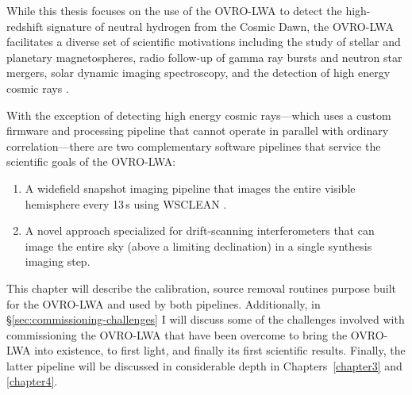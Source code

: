 \begin{bibunit}
While this thesis focuses on the use of the OVRO-LWA to detect the high-redshift signature of
neutral hydrogen from the Cosmic Dawn, the OVRO-LWA facilitates a diverse set of scientific
motivations including the study of stellar and planetary magnetospheres, radio follow-up of gamma
ray bursts \citep{2017arXiv171106665A} and neutron star mergers, solar dynamic imaging spectroscopy,
and the detection of high energy cosmic rays \citep{caltechthesis11016}.

With the exception of detecting high energy cosmic rays---which uses a custom firmware and
processing pipeline that cannot operate in parallel with ordinary correlation---there are two
complementary software pipelines that service the scientific goals of the OVRO-LWA:
\begin{enumerate}
    \item A widefield snapshot imaging pipeline that images the entire visible hemisphere every
        13\,s using WSCLEAN \citep{2014MNRAS.444..606O}.
    \item A novel approach specialized for drift-scanning interferometers that can image the entire
        sky (above a limiting declination) in a single synthesis imaging step.
\end{enumerate}
This chapter will describe the calibration, source removal routines purpose built for the OVRO-LWA
and used by both pipelines. Additionally, in \S\ref{sec:commissioning-challenges} I will discuss
some of the challenges involved with commissioning the OVRO-LWA that have been overcome to bring the
OVRO-LWA into existence, to first light, and finally its first scientific results.  Finally, the
latter pipeline will be discussed in considerable depth in Chapters~\ref{chapter3} and
\ref{chapter4}.


\end{bibunit}
